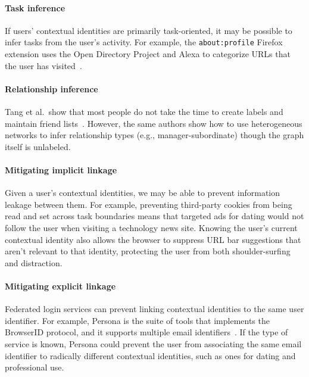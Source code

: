 \documentclass[10pt, conference, compsocconf]{IEEEtran}
\begin{document}
\paragraph{Task inference}
If users' contextual identities are primarily task-oriented, it may be
possible to infer tasks from the user's activity. For example, the
\texttt{about:profile} Firefox extension uses the Open Directory Project and
Alexa to categorize URLs that the user has visited~\cite{aboutprofile}.

\paragraph{Relationship inference}
Tang et al.~show that most people do not take the time to create labels and
maintain friend lists~\cite{tang}. However, the same authors show how to use
heterogeneous networks to infer relationship types (e.g., manager-subordinate)
though the graph itself is unlabeled.

\paragraph{Mitigating implicit linkage}
Given a user's contextual identities, we may be able to prevent information
leakage between them.  For example, preventing third-party cookies from being
read and set across task boundaries means that targeted ads for dating would
not follow the user when visiting a technology news site. Knowing the user's
current contextual identity also allows the browser to suppress URL bar
suggestions that aren't relevant to that identity, protecting the user from
both shoulder-surfing and distraction.

\paragraph{Mitigating explicit linkage}
Federated login services can prevent linking contextual identities to the same
user identifier. For example, Persona is the suite of tools that implements the
BrowserID protocol, and it supports multiple email
identifiers~\cite{browserid}.  If the type of service is known, Persona could
prevent the user from associating the same email identifier to radically
different contextual identities, such as ones for dating and professional use.
\end{document}

